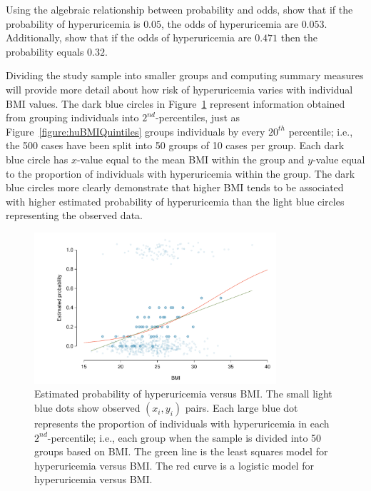 \begin{exercisewrap}
\begin{nexercise}
  Using the algebraic relationship between probability and odds, show that if the probability of hyperuricemia is $0.05$, the odds of hyperuricemia are $0.053$. Additionally, show that if the odds of hyperuricemia are $0.471$ then the probability equals $0.32$.\footnotemark{}
\end{nexercise}
\end{exercisewrap}

Dividing the study sample into smaller groups and computing summary measures will provide more detail about how risk of hyperuricemia varies with individual BMI values. The dark blue circles in Figure~\ref{figure:bmiHuProbSecondTile} represent information obtained from grouping individuals into $2^{nd}$-percentiles, just as Figure~\ref{figure:huBMIQuintiles} groups individuals by every $20^{th}$ percentile; i.e., the 500 cases have been split into 50 groups of 10 cases per group. Each dark blue circle has $x$-value equal to the mean BMI within the group and $y$-value equal to the proportion of individuals with hyperuricemia within the group. The dark blue circles more clearly demonstrate that higher BMI tends to be associated with higher estimated probability of hyperuricemia than the light blue circles representing the observed data.

\begin{figure}[h!]
	\centering
	\includegraphics[width=0.80\textwidth]
	{ch_logistic_regression_oi_biostat/figures/bmiHuProbSecondTile/bmiHuProbSecondTile.pdf}
    \caption{Estimated probability of hyperuricemia versus BMI. The small light blue dots show observed $(x_i, y_i)$ pairs. Each large blue dot represents the proportion of individuals with hyperuricemia in each $2^{nd}$-percentile; i.e., each group when the sample is divided into 50 groups based on BMI. The green line is the least squares model for hyperuricemia versus BMI. The red curve is a logistic model for hyperuricemia versus BMI.}
    \label{figure:bmiHuProbSecondTile}
\end{figure}


